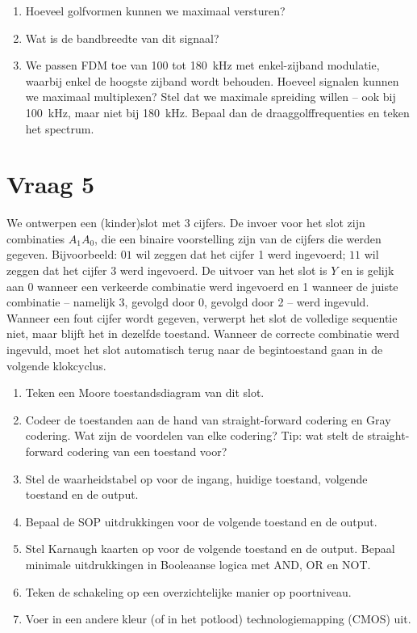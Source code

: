\documentclass{kuburgiearticle}
\begin{document}
	\begin{enumerate}
		\item Hoeveel golfvormen kunnen we maximaal versturen?
		\item Wat is de bandbreedte van dit signaal?
		\item We passen FDM toe van 100 tot \SI{180}{\kilo\hertz} met enkel-zijband modulatie, waarbij enkel de hoogste zijband wordt behouden. Hoeveel signalen kunnen we maximaal multiplexen? Stel dat we maximale spreiding willen -- ook bij \SI{100}{\kilo\hertz}, maar niet bij \SI{180}{\kilo\hertz}. Bepaal dan de draaggolffrequenties en teken het spectrum.
	\end{enumerate}

	\section*{Vraag 5}

	We ontwerpen een (kinder)slot met 3 cijfers. De invoer voor het slot zijn combinaties \(A_1 A_0\), die een binaire voorstelling zijn van de cijfers die werden gegeven. Bijvoorbeeld: \(01\) wil zeggen dat het cijfer 1 werd ingevoerd; \(11\) wil zeggen dat het cijfer 3 werd ingevoerd. De uitvoer van het slot is \(Y\) en is gelijk aan 0 wanneer een verkeerde combinatie werd ingevoerd en 1 wanneer de juiste combinatie -- namelijk 3, gevolgd door 0, gevolgd door 2 -- werd ingevuld. Wanneer een fout cijfer wordt gegeven, verwerpt het slot de volledige sequentie niet, maar blijft het in dezelfde toestand. Wanneer de correcte combinatie werd ingevuld, moet het slot automatisch terug naar de begintoestand gaan in de volgende klokcyclus.

	\begin{enumerate}
		\item Teken een Moore toestandsdiagram van dit slot.
		\item Codeer de toestanden aan de hand van straight-forward codering en Gray codering. Wat zijn de voordelen van elke codering? Tip: wat stelt de straight-forward codering van een toestand voor?
		\item Stel de waarheidstabel op voor de ingang, huidige toestand, volgende toestand en de output.
		\item Bepaal de SOP uitdrukkingen voor de volgende toestand en de output.
		\item Stel Karnaugh kaarten op voor de volgende toestand en de output. Bepaal minimale uitdrukkingen in Booleaanse logica met AND, OR en NOT.
		\item Teken de schakeling op een overzichtelijke manier op poortniveau.
		\item Voer in een andere kleur (of in het potlood) technologiemapping (CMOS) uit.
	\end{enumerate}
\end{document}
